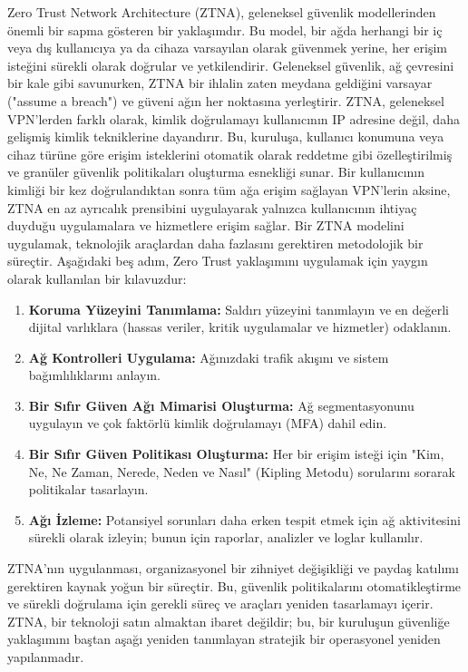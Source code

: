 Zero Trust Network Architecture (ZTNA), geleneksel güvenlik modellerinden önemli bir sapma gösteren bir yaklaşımdır. Bu model, bir ağda herhangi bir iç veya dış kullanıcıya ya da cihaza varsayılan olarak güvenmek yerine, her erişim isteğini sürekli olarak doğrular ve yetkilendirir. Geleneksel güvenlik, ağ çevresini bir kale gibi savunurken, ZTNA bir ihlalin zaten meydana geldiğini varsayar ("assume a breach") ve güveni ağın her noktasına yerleştirir.
ZTNA, geleneksel VPN'lerden farklı olarak, kimlik doğrulamayı kullanıcının IP adresine değil, daha gelişmiş kimlik tekniklerine dayandırır. Bu, kuruluşa, kullanıcı konumuna veya cihaz türüne göre erişim isteklerini otomatik olarak reddetme gibi özelleştirilmiş ve granüler güvenlik politikaları oluşturma esnekliği sunar. Bir kullanıcının kimliği bir kez doğrulandıktan sonra tüm ağa erişim sağlayan VPN'lerin aksine, ZTNA en az ayrıcalık prensibini uygulayarak yalnızca kullanıcının ihtiyaç duyduğu uygulamalara ve hizmetlere erişim sağlar.
Bir ZTNA modelini uygulamak, teknolojik araçlardan daha fazlasını gerektiren metodolojik bir süreçtir. Aşağıdaki beş adım, Zero Trust yaklaşımını uygulamak için yaygın olarak kullanılan bir kılavuzdur:

\begin{enumerate}
\item \textbf{Koruma Yüzeyini Tanımlama:} Saldırı yüzeyini tanımlayın ve en değerli dijital varlıklara (hassas veriler, kritik uygulamalar ve hizmetler) odaklanın.
\item \textbf{Ağ Kontrolleri Uygulama:} Ağınızdaki trafik akışını ve sistem bağımlılıklarını anlayın.
\item \textbf{Bir Sıfır Güven Ağı Mimarisi Oluşturma:} Ağ segmentasyonunu uygulayın ve çok faktörlü kimlik doğrulamayı (MFA) dahil edin.
\item \textbf{Bir Sıfır Güven Politikası Oluşturma:} Her bir erişim isteği için "Kim, Ne, Ne Zaman, Nerede, Neden ve Nasıl" (Kipling Metodu) sorularını sorarak politikalar tasarlayın.
\item \textbf{Ağı İzleme:} Potansiyel sorunları daha erken tespit etmek için ağ aktivitesini sürekli olarak izleyin; bunun için raporlar, analizler ve loglar kullanılır.
\end{enumerate}

ZTNA'nın uygulanması, organizasyonel bir zihniyet değişikliği ve paydaş katılımı gerektiren kaynak yoğun bir süreçtir. Bu, güvenlik politikalarını otomatikleştirme ve sürekli doğrulama için gerekli süreç ve araçları yeniden tasarlamayı içerir. ZTNA, bir teknoloji satın almaktan ibaret değildir; bu, bir kuruluşun güvenliğe yaklaşımını baştan aşağı yeniden tanımlayan stratejik bir operasyonel yeniden yapılanmadır.

